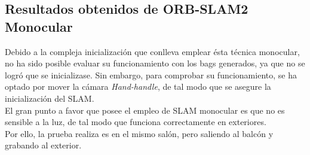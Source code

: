 \newpage
\subsection{Resultados obtenidos de ORB-SLAM2 Monocular}
Debido a la compleja inicialización que conlleva emplear ésta técnica monocular, no ha sido posible evaluar su funcionamiento con los bags generados, ya que no se logró que se
inicializase. Sin embargo, para comprobar su funcionamiento, se ha optado por mover la cámara \textit{Hand-handle}, de tal modo que se asegure la inicialización del SLAM. \\
El gran punto a favor que posee el empleo de SLAM monocular es que no es sensible a la luz, de tal modo que funciona correctamente en exteriores. \\
Por ello, la prueba realiza es en el mismo salón, pero saliendo al balcón y grabando al exterior. \\
